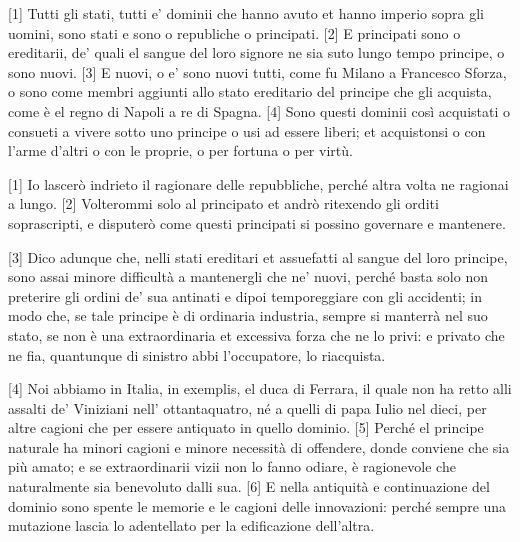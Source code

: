 \setcounter{secnumdepth}{4}


{[}1{]} Tutti gli stati, tutti e' dominii che hanno avuto et hanno
imperio sopra gli uomini, sono stati e sono o republiche o principati.
{[}2{]} E principati sono o ereditarii, de' quali el sangue del loro
signore ne sia suto lungo tempo principe, o sono nuovi. {[}3{]} E nuovi,
o e' sono nuovi tutti, come fu Milano a Francesco Sforza, o sono come
membri aggiunti allo stato ereditario del principe che gli acquista,
come è el regno di Napoli a re di Spagna. {[}4{]} Sono questi dominii
così acquistati o consueti a vivere sotto uno principe o usi ad essere
liberi; et acquistonsi o con l'arme d'altri o con le proprie, o per
fortuna o per virtù.


{[}1{]} Io lascerò indrieto il ragionare delle repubbliche, perché altra
volta ne ragionai a lungo. {[}2{]} Volterommi solo al principato et
andrò ritexendo gli orditi soprascripti, e disputerò come questi
principati si possino governare e mantenere.

{[}3{]} Dico adunque che, nelli stati ereditari et assuefatti al sangue
del loro principe, sono assai minore difficultà a mantenergli che ne'
nuovi, perché basta solo non preterire gli ordini de' sua antinati e
dipoi temporeggiare con gli accidenti; in modo che, se tale principe è
di ordinaria industria, sempre si manterrà nel suo stato, se non è una
extraordinaria et excessiva forza che ne lo privi: e privato che ne fia,
quantunque di sinistro abbi l'occupatore, lo riacquista.

{[}4{]} Noi abbiamo in Italia, in exemplis, el duca di Ferrara, il quale
non ha retto alli assalti de' Viniziani nell' ottantaquatro, né a quelli
di papa Iulio nel dieci, per altre cagioni che per essere antiquato in quello dominio. {[}5{]} Perché el
principe naturale ha minori cagioni e minore necessità di offendere,
donde conviene che sia più amato; e se extraordinarii vizii non lo fanno
odiare, è ragionevole che naturalmente sia benevoluto dalli sua. {[}6{]}
E nella antiquità e continuazione del dominio sono spente le memorie e
le cagioni delle innovazioni: perché sempre una mutazione lascia lo
adentellato per la edificazione dell'altra.

